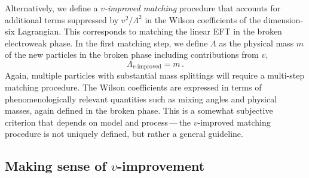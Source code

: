 Alternatively, we define a \emph{$v$-improved matching} procedure that
accounts for additional terms suppressed by $v^2 / \Lambda^2$ in the
Wilson coefficients of the dimension-six Lagrangian. This corresponds
to matching the linear EFT in the broken electroweak phase. In the
first matching step, we define $\Lambda$ as the physical mass $m$ of
the new particles in the broken phase including contributions from
$v$,
%
\begin{equation}
  \Lambda_{\text{$v$-improved}} = m \,.
\end{equation}
%
Again, multiple particles with substantial mass splittings will
require a multi-step matching procedure. The Wilson coefficients are
expressed in terms of phenomenologically relevant quantities such as
mixing angles and physical masses, again defined in the broken
phase. This is a somewhat subjective criterion that depends on model
and process\,---\,the $v$-improved matching procedure is not uniquely
defined, but rather a general guideline.



\subsection{Making sense of $v$-improvement}

